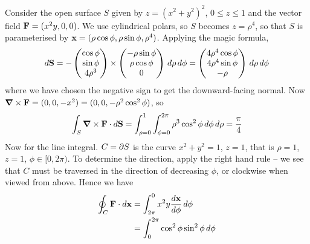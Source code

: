 \documentclass{../../template/note}
\begin{document}
    \begin{example*}
        Consider the open surface \(S\) given by \(z = (x^2+y^2)^2\), \(0 \leq z \leq 1\) and the vector field \(\V F = (x^2y, 0, 0)\). We use cylindrical polars, so \(S\) becomes \(z=\rho^4\), so that \(S\) is parameterised by \(\V x = (\rho \cos \phi, \rho \sin \phi, \rho^4)\). Applying the magic formula,
        \begin{align*}
            d\V S = -\begin{pmatrix}
             \cos \phi \\
             \sin \phi \\
             4\rho^3 \\
            \end{pmatrix} \times \begin{pmatrix}
             -\rho \sin \phi \\
             \rho \cos \phi \\
             0 \\
            \end{pmatrix}\D\rho\D\phi = \begin{pmatrix}
             4\rho^4\cos\phi \\
             4\rho^4\sin\phi \\
             -\rho \\
            \end{pmatrix}\D\rho\D\phi
        \end{align*}
        where we have chosen the negative sign to get the downward-facing normal. Now \(\curl \V F = (0, 0, -x^2) = (0, 0, -\rho^2 \cos^2 \phi)\), so
        \begin{align*}
            \int_S \curl \V F \cdot d\V S = \int_{\rho=0}^1 \int_{\phi=0}^{2\pi} \rho^3 \cos^2 \phi \D \phi \D \rho = \frac \pi 4
        \end{align*}
        Now for the line integral. \(C = \partial S\) is the curve \(x^2+y^2=1\), \(z=1\), that is \(\rho = 1\), \(z=1\), \(\phi \in [0, 2\pi)\). To determine the direction, apply the right hand rule -- we see that \(C\) must be traversed in the direction of decreasing \(\phi\), or clockwise when viewed from above. Hence we have
        \begin{align*}
            \oint_C \V F \cdot d\V x &= \int_{2\pi}^0 x^2y \frac{d\V x}{d\phi} \D \phi \\
            &= \int_0^{2\pi} \cos^2\phi \sin^2\phi \D \phi
        \end{align*}       
    \end{example*}
    
\end{document}
